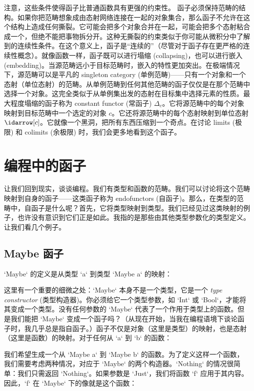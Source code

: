 \noindent
注意，这些条件使得函子比普通函数具有更强的约束性。
函子必须保持范畴的结构。如果你把范畴想象成由态射网络连接在一起的对象集合，那么函子不允许在这个结构上造成任何撕裂。它可能会把多个对象合并在一起，可能会把多个态射粘合成一个，但绝不能把事物拆分开。这种无撕裂的约束类似于你可能从微积分中了解到的连续性条件。在这个意义上，函子是“连续的”（尽管对于函子存在更严格的连续性概念）。就像函数一样，函子既可以进行塌缩 (collapsing)，也可以进行嵌入 (embedding)。当源范畴远小于目标范畴时，嵌入的特性更加突出。在极端情况下，源范畴可以是平凡的 singleton category (单例范畴)——只有一个对象和一个态射（单位态射）的范畴。从单例范畴到任何其他范畴的函子仅仅是在那个范畴中选择一个对象。这完全类似于从单例集出发的态射在目标集中选择元素的性质。最大程度塌缩的函子称为 constant functor (常函子) $\Delta_c$。它将源范畴中的每个对象映射到目标范畴中一个选定的对象 $c$。它还将源范畴中的每个态射映射到单位态射 $\idarrow[c]$。它就像一个黑洞，把所有东西压缩到一个奇点。在讨论 limits (极限) 和 colimits (余极限) 时，我们会更多地看到这个函子。

\section{编程中的函子}

让我们回到现实，谈谈编程。我们有类型和函数的范畴。我们可以讨论将这个范畴映射到自身的函子——这类函子称为 endofunctors (自函子)。那么，在类型的范畴中，自函子是什么呢？首先，它将类型映射到类型。我们已经见过这类映射的例子，也许没有意识到它们正是如此。我指的是那些由其他类型参数化的类型定义。让我们看几个例子。

\subsection{Maybe 函子}

`Maybe` 的定义是从类型 `a` 到类型 `Maybe a` 的映射：

这里有一个重要的细微之处：`Maybe` 本身不是一个类型，它是一个 \emph{type constructor} (类型构造器)。你必须给它一个类型参数，如 `Int` 或 `Bool`，才能将其变成一个类型。没有任何参数的 `Maybe` 代表了一个作用于类型上的函数。但是我们能把 `Maybe` 变成一个函子吗？（从现在开始，当我在编程语境下谈论函子时，我几乎总是指自函子。）函子不仅是对象（这里是类型）的映射，也是态射（这里是函数）的映射。对于任何从 `a` 到 `b` 的函数：

我们希望生成一个从 `Maybe a` 到 `Maybe b` 的函数。为了定义这样一个函数，我们需要考虑两种情况，对应于 `Maybe` 的两个构造器。`Nothing` 的情况很简单：我们只需返回 `Nothing`。如果参数是 `Just`，我们将函数 `f` 应用于其内容。因此，`f` 在 `Maybe` 下的像就是这个函数：

